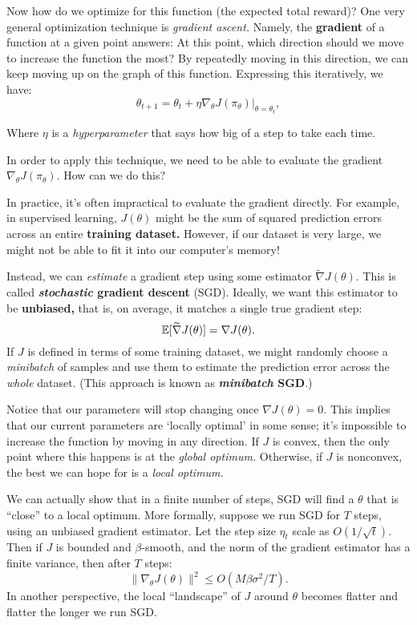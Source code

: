 \documentclass[\main/main]{subfiles}
\begin{document}
Now how do we optimize for this function (the expected total reward)?
One very general optimization technique is \emph{gradient ascent.} Namely, the \textbf{gradient} of a function at a given point answers: At this point, which direction should we move to increase the function the most? By repeatedly moving in this direction, we can keep moving up on the graph of this function. Expressing this iteratively, we have: \[
    \theta_{t+1} = \theta_t + \eta \nabla_\theta J(\pi_\theta) \Big|_{\theta = \theta_t},
\]

Where $\eta$ is a \emph{hyperparameter} that says how big of a step to take each time.

In order to apply this technique, we need to be able to evaluate the gradient $\nabla_\theta J(\pi_\theta).$ How can we do this?

In practice, it's often impractical to evaluate the gradient directly. For example, in supervised learning, $J(\theta)$ might be the sum of squared prediction errors across an entire \textbf{training dataset.} However, if our dataset is very large, we might not be able to fit it into our computer's memory!

Instead, we can \emph{estimate} a gradient step using some estimator $\tilde \nabla J(\theta).$ This is called \textbf{\emph{stochastic} gradient descent} (SGD). Ideally, we want this estimator to be \textbf{unbiased,} that is, on average, it matches a single true gradient step:
\[ \operatorname*{\mathbb{E}} [\widetilde \nabla J(\theta)] = \nabla J(\theta). \]
If $J$ is defined in terms of some training dataset, we might randomly choose a \emph{minibatch} of samples and use them to estimate the prediction error across the \emph{whole} dataset. (This approach is known as \textbf{\emph{minibatch} SGD}.)

Notice that our parameters will stop changing once $\nabla J(\theta) = 0.$ This implies that our current parameters are `locally optimal' in some sense; it's impossible to increase the function by moving in any direction. If $J$ is convex, then the only point where this happens is at the \emph{global optimum.} Otherwise, if $J$ is nonconvex, the best we can hope for is a \emph{local optimum.}

We can actually show that in a finite number of steps, SGD will find a $\theta$ that is ``close'' to a local optimum. More formally, suppose we run SGD for $T$ steps, using an unbiased gradient estimator. Let the step size $\eta_t$ scale as $O(1/ \sqrt{t}).$ Then if $J$ is bounded and $\beta$-smooth, and the norm of the gradient estimator has a finite variance, then after $T$ steps: \[
    \|\nabla_\theta J(\theta)\|^2 \le O \left( M \beta \sigma^2 / T\right).
\]
In another perspective, the local ``landscape'' of $J$ around $\theta$ becomes flatter and flatter the longer we run SGD.
\end{document}
